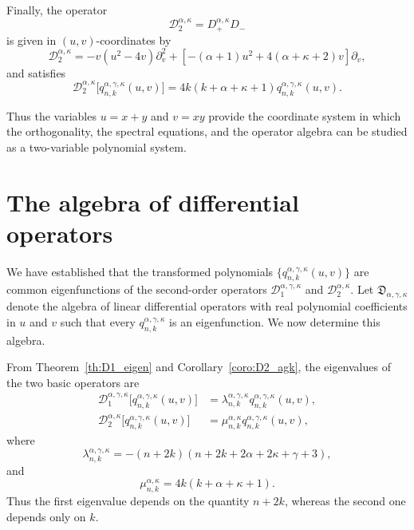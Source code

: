 \documentclass[reqno,10pt]{amsart}
\theoremstyle{plain}
\numberwithin{equation}{section}
\numberwithin{figure}{section}
\begin{document}
Finally, the operator
\[
\mathcal{D}_{2}^{\alpha,\kappa}
=
D_{+}^{\alpha,\kappa}D_{-}
\]
is given in $(u,v)$-coordinates by
\[
\mathcal D_2^{\alpha,\kappa}
=
-v(u^2-4v)\partial_v^2
+
\left[-(\alpha+1)u^2+4(\alpha+\kappa+2)v\right]\partial_v,
\]
and satisfies
\[
\mathcal{D}_{2}^{\alpha,\kappa}
\big[q_{n,k}^{\alpha,\gamma,\kappa}(u,v)\big]
=
4k(k+\alpha+\kappa+1)
q_{n,k}^{\alpha,\gamma,\kappa}(u,v).
\]

Thus the variables \(u=x+y\) and \(v=xy\) provide the coordinate system in
which the orthogonality, the spectral equations, and the operator algebra
can be studied as a two-variable polynomial system.

\section{The algebra of differential operators}\label{sec:algebra}

We have established that the transformed polynomials
\(\{q_{n,k}^{\alpha,\gamma,\kappa}(u,v)\}\) are common eigenfunctions of
the second-order operators
\(\mathcal D_1^{\alpha,\gamma,\kappa}\) and
\(\mathcal D_2^{\alpha,\kappa}\). Let \(\mathfrak D_{\alpha,\gamma,\kappa}\) denote the algebra of linear
differential operators with real polynomial coefficients in \(u\) and \(v\)
such that every \(q_{n,k}^{\alpha,\gamma,\kappa}\) is an eigenfunction.
We now determine this algebra.

From Theorem~\ref{th:D1_eigen} and Corollary~\ref{coro:D2_agk}, the
eigenvalues of the two basic operators are
\begin{equation}\label{eq:eigD2_agk}
\begin{aligned}
\mathcal{D}_{1}^{\alpha,\gamma,\kappa}
\big[q_{n,k}^{\alpha,\gamma,\kappa}(u,v)\big]
&=
\lambda_{n,k}^{\alpha,\gamma,\kappa}
q_{n,k}^{\alpha,\gamma,\kappa}(u,v),
\\[4pt]
\mathcal{D}_{2}^{\alpha,\kappa}
\big[q_{n,k}^{\alpha,\gamma,\kappa}(u,v)\big]
&=
\mu_{n,k}^{\alpha,\kappa}
q_{n,k}^{\alpha,\gamma,\kappa}(u,v),
\end{aligned}
\end{equation}
where
\[
\lambda_{n,k}^{\alpha,\gamma,\kappa}
=
-(n+2k)(n+2k+2\alpha+2\kappa+\gamma+3),
\]
and
\[
\mu_{n,k}^{\alpha,\kappa}
=
4k(k+\alpha+\kappa+1).
\]
Thus the first eigenvalue depends on the quantity \(n+2k\), whereas the
second one depends only on \(k\). 
\end{document}
